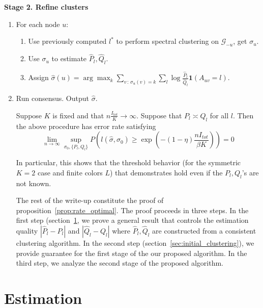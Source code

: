 \documentclass{article}
\begin{document}
 \textbf{Stage 2. Refine clusters}
\begin{enumerate}
\item For each node $u$:
  \begin{enumerate}
  \item Use previously computed $l^*$ to perform spectral clustering on $\mathcal{G}_{-u}$, get $\sigma_u$.
   \item Use $\sigma_u$ to estimate $\hat{P}_l, \hat{Q}_l$.
   \item Assign $\hat{\sigma}(u) = \arg\max_k \sum_{v \,:\, \sigma_u(v) = k} \sum_l 
                  \log \frac{\hat{P}_l}{\hat{Q}_l} \mathbf{1}(A_{uv} = l) $. 
   \end{enumerate}
\item Run consensus. Output $\hat{\sigma}$. 

\begin{shaded}
\begin{proposition}
\label{prop:rate_optimal}
Suppose $K$ is fixed and that $n \frac{I_{tot}}{K} \rightarrow \infty$. Suppose that $P_l \asymp Q_l$ for all $l$. Then the above procedure has error rate satisfying
\[
\lim_{n \rightarrow \infty}  \sup_{\sigma_0, \{P_l, Q_l\}} P \left( l(\hat{\sigma}, \sigma_0) \geq \exp\left( - (1 - \eta) \frac{ n I_{tot}}{\beta K} \right) \right) = 0
\]
\end{proposition}
\end{shaded}

In particular, this shows that the threshold behavior (for the symmetric $K=2$ case and finite colors $L$) that \cite{jog2015information} demonstrates hold even if the $P_l, Q_l$'s are not known. 

The rest of the write-up constitute the proof of proposition~\ref{prop:rate_optimal}. The proof proceeds in three steps. In the first step (section~\ref{sec:estimation}, we prove a general result that controls the estimation quality $| \hat{P}_l - P_l |$ and $|\hat{Q}_l - Q_l|$ where $\hat{P}_l, \hat{Q}_l$ are constructed from a consistent clustering algorithm. In the second step (section~\ref{sec:initial_clustering}), we provide guarantee for the first stage of the our proposed algorithm. In the third step, we analyze the second stage of the proposed algorithm.

\end{enumerate}

\section{Estimation}
\label{sec:estimation}
\end{document}
